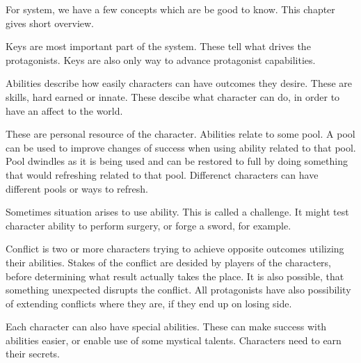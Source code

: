 For system, we have a few concepts which are be good to know.
This chapter gives short overview.

Keys are most important part of the system.
These tell what drives the protagonists.
Keys are also only way to advance protagonist capabilities.

Abilities describe how easily characters can have outcomes they desire.
These are skills, hard earned or innate.
These descibe what character can do, in order to have an affect to the world.

These are personal resource of the character.
Abilities relate to some pool.
A pool can be used to improve changes of success when using ability related to that pool.
Pool dwindles as it is being used and can be restored to full by doing something that would refreshing related to that pool.
Differenct characters can have different pools or ways to refresh.

Sometimes situation arises to use ability.
This is called a challenge.
It might test character ability to perform surgery, or forge a sword, for example.

Conflict is two or more characters trying to achieve opposite outcomes utilizing their abilities.
Stakes of the conflict are desided by players of the characters, before determining what result actually takes the place.
It is also possible, that something unexpected disrupts the conflict.
All protagonists have also possibility of extending conflicts where they are, if they end up on losing side.

Each character can also have special abilities.
These can make success with abilities easier, or enable use of some mystical talents.
Characters need to earn their secrets.

\pagebreak

